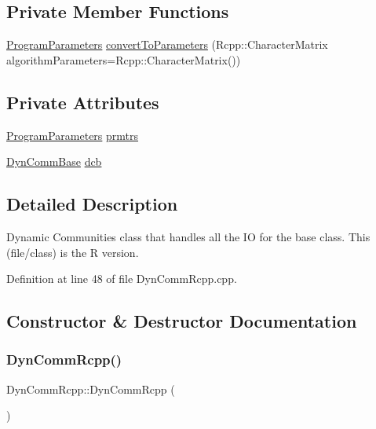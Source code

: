 \subsection*{Private Member Functions}
\begin{DoxyCompactItemize}
\item 
\hyperlink{structProgramParameters}{Program\+Parameters} \hyperlink{classDynCommRcpp_a52692d421657ffcbe6a97762de9deddc}{convert\+To\+Parameters} (Rcpp\+::\+Character\+Matrix algorithm\+Parameters=Rcpp\+::\+Character\+Matrix())
\end{DoxyCompactItemize}
\subsection*{Private Attributes}
\begin{DoxyCompactItemize}
\item 
\hyperlink{structProgramParameters}{Program\+Parameters} \hyperlink{classDynCommRcpp_a686a84dced9c0cd812cb184d48958758}{prmtrs}
\item 
\hyperlink{classDynCommBase}{Dyn\+Comm\+Base} \hyperlink{classDynCommRcpp_a29aa77f1324fd9891a67feedea880961}{dcb}
\end{DoxyCompactItemize}


\subsection{Detailed Description}
Dynamic Communities class that handles all the IO for the base class. This (file/class) is the R version. 

Definition at line 48 of file Dyn\+Comm\+Rcpp.\+cpp.



\subsection{Constructor \& Destructor Documentation}
\mbox{\label{classDynCommRcpp_a65289b1838009023b527237b64c073a2}} 
\subsubsection{\texorpdfstring{Dyn\+Comm\+Rcpp()}{DynCommRcpp()}\hspace{0.1cm}{\footnotesize\ttfamily [1/2]}}
{\footnotesize\ttfamily Dyn\+Comm\+Rcpp\+::\+Dyn\+Comm\+Rcpp (\begin{DoxyParamCaption}{ }\end{DoxyParamCaption})\hspace{0.3cm}{\ttfamily [delete]}}

